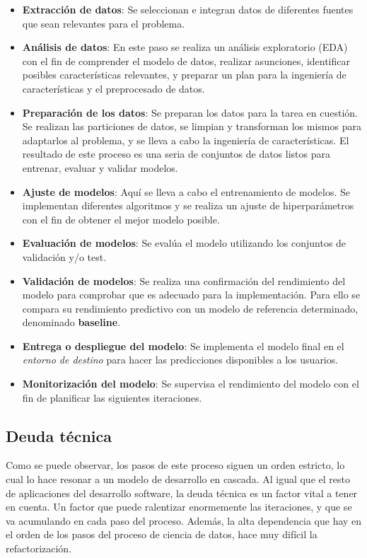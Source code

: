 \documentclass[
  12pt,
  a4paperpaper,
]{report}
\begin{document}
\begin{itemize}
\item
  \textbf{Extracción de datos}: Se seleccionan e integran datos de
  diferentes fuentes que sean relevantes para el problema.
\item
  \textbf{Análisis de datos}: En este paso se realiza un análisis
  exploratorio (EDA) con el fin de comprender el modelo de datos,
  realizar asunciones, identificar posibles características relevantes,
  y preparar un plan para la ingeniería de características y el
  preprocesado de datos.
\item
  \textbf{Preparación de los datos}: Se preparan los datos para la tarea
  en cuestión. Se realizan las particiones de datos, se limpian y
  transforman los mismos para adaptarlos al problema, y se lleva a cabo
  la ingeniería de características. El resultado de este proceso es una
  seria de conjuntos de datos listos para entrenar, evaluar y validar
  modelos.
\item
  \textbf{Ajuste de modelos}: Aquí se lleva a cabo el entrenamiento de
  modelos. Se implementan diferentes algoritmos y se realiza un ajuste
  de hiperparámetros con el fin de obtener el mejor modelo posible.
\item
  \textbf{Evaluación de modelos}: Se evalúa el modelo utilizando los
  conjuntos de validación y/o test.
\item
  \textbf{Validación de modelos}: Se realiza una confirmación del
  rendimiento del modelo para comprobar que es adecuado para la
  implementación. Para ello se compara su rendimiento predictivo con un
  modelo de referencia determinado, denominado \textbf{baseline}.
\item
  \textbf{Entrega o despliegue del modelo}: Se implementa el modelo
  final en el \emph{entorno de destino} para hacer las predicciones
  disponibles a los usuarios.
\item
  \textbf{Monitorización del modelo}: Se supervisa el rendimiento del
  modelo con el fin de planificar las siguientes iteraciones.
\end{itemize}

\hypertarget{deuda-tuxe9cnica}{%
\subsection{Deuda técnica}\label{deuda-tuxe9cnica}}

Como se puede observar, los pasos de este proceso siguen un orden
estricto, lo cual lo hace resonar a un modelo de desarrollo en cascada.
Al igual que el resto de aplicaciones del desarrollo software, la deuda
técnica es un factor vital a tener en cuenta. Un factor que puede
ralentizar enormemente las iteraciones, y que se va acumulando en cada
paso del proceso. Además, la alta dependencia que hay en el orden de los
pasos del proceso de ciencia de datos, hace muy difícil la
refactorización.
\end{document}
